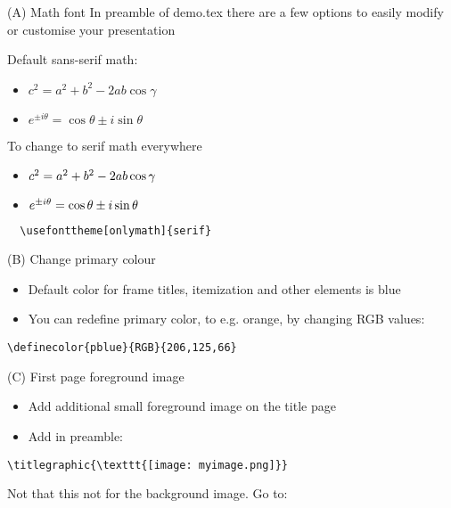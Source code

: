\documentclass[10pt,t]{beamer}
\begin{document}
\begin{frame}[fragile]{(A) Math font}
In preamble of demo.tex there are a few options to easily modify or customise your presentation 

\medskip
Default sans-serif math:
    \begin{itemize}
        \item $ c^2 = a^2+b^2 - 2ab \cos\gamma $
        \item $e^{ \pm i\theta } = \cos \theta \pm i\sin \theta$
    \end{itemize}

\medskip
To change to serif math everywhere

    \begin{itemize}
        \item $ \mathnormal{c^\mathrm{2} = a^\mathrm{2}+b^\mathrm{2} - \mathrm{2}ab \cos\gamma} $
        \item $\mathnormal{e^{ \pm i\theta } = \cos \theta \pm i\sin \theta}$
    \end{itemize}
\medskip
\verb+  \usefonttheme[onlymath]{serif}+

\end{frame}




\begin{frame}[fragile]{(B) Change primary colour}
    \begin{itemize}
        \item Default color for frame titles, itemization and other elements is \textcolor{pblue}{blue}
        \item You can redefine primary color, to e.g. orange, by changing RGB values:
    \end{itemize}

\medskip
\verb+\definecolor{pblue}{RGB}{+{\color{red}\verb+206,125,66+}\verb+}+
\end{frame}


\begin{frame}[fragile]{(C) First page foreground image}
    \begin{itemize}
        \item Add additional small foreground image on the title page
        \item Add in preamble:
    \end{itemize}

\vspace{12pt}
\begin{verbatim}
\titlegraphic{\texttt{[image: myimage.png]}}
\end{verbatim}

\medskip
\centering Not that this not for the background image. Go to: \hyperlink{background_image}{}

\end{frame}
\end{document}
